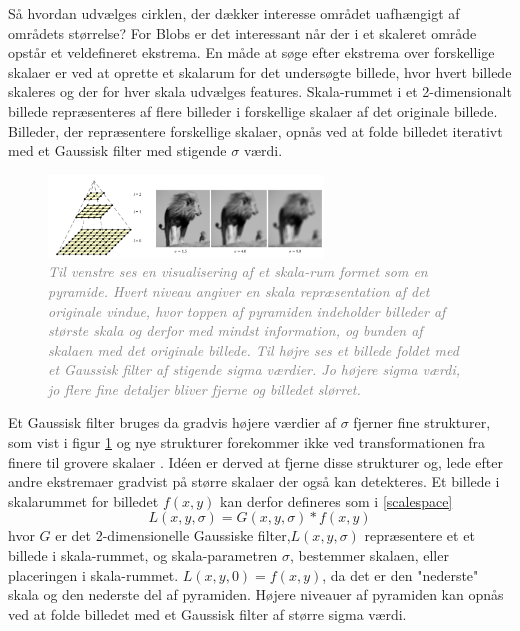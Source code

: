        \vspace{-2.5em}
\noindent
Så hvordan udvælges cirklen, der dækker interesse området uafhængigt af områdets størrelse?  For Blobs er det interessant når der i et skaleret område opstår et veldefineret ekstrema. En måde at søge efter ekstrema over forskellige skalaer er ved at oprette et skalarum for det undersøgte billede, hvor hvert billede skaleres og der for hver skala udvælges features. Skala-rummet i et 2-dimensionalt billede repræsenteres af flere billeder i forskellige skalaer af det originale billede. Billeder, der repræsentere forskellige skalaer, opnås ved at folde billedet iterativt med et Gaussisk filter med stigende $\sigma$ værdi. 
\begin{figure}[H]
    \centering
    \includegraphics[width=0.65\textwidth]{fig/24.png}
    \vspace{-0.5em}   
    \begin{center}
    \caption{\textcolor{gray}{\footnotesize \textit{
Til venstre ses en visualisering af et skala-rum formet som en pyramide. Hvert niveau angiver en skala repræsentation af det originale vindue, hvor toppen af pyramiden indeholder billeder af største skala og derfor med mindst information, og bunden af skalaen med det originale billede. Til højre ses et billede foldet med et Gaussisk filter af stigende sigma værdier. Jo højere sigma værdi, jo flere fine detaljer bliver fjerne og billedet slørret.
    }}}
    \label{fig:mona}
     \end{center}
  \end{figure}
       \vspace{-2.5em}
\noindent
Et Gaussisk filter bruges da gradvis højere værdier af $\sigma$ fjerner fine strukturer, som vist i figur \ref{fig:mona} og nye strukturer forekommer ikke ved transformationen fra finere til grovere skalaer \cite{lindenscale}. Idéen er derved at fjerne disse strukturer og, lede efter  andre ekstremaer gradvist på større skalaer der også kan detekteres.
Et billede i skalarummet for billedet $f(x,y)$ kan derfor defineres som i \eqref{scalespace}
\begin{equation}
L(x,y,\sigma) = G(x,y,\sigma)\ast f(x,y)
\label{scalespace}
\end{equation}
hvor $G$ er det 2-dimensionelle Gaussiske filter,$L(x,y,\sigma)$ repræsentere et et billede i skala-rummet, og skala-parametren $\sigma$, bestemmer skalaen, eller placeringen i skala-rummet. $L(x,y,0) = f(x,y)$, da det er den "nederste" skala og den nederste del af pyramiden. Højere niveauer af pyramiden kan opnås ved at folde billedet med et Gaussisk filter af større sigma værdi.

